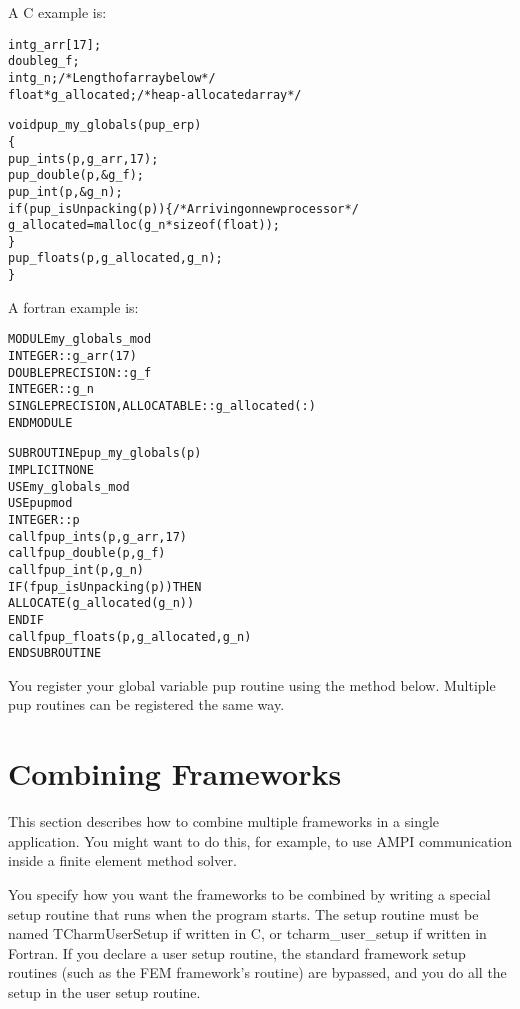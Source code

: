 \documentclass[10pt]{article}
\begin{document}
A C example is:
\begin{alltt}
     int g_arr[17];
     double g_f;
     int g_n; /*Length of array below*/
     float *g_allocated; /*heap-allocated array*/
 
     void pup_my_globals(pup_er p)
     \{
       pup_ints(p,g_arr,17);
       pup_double(p,&g_f);
       pup_int(p,&g_n);
       if (pup_isUnpacking(p)) \{ /*Arriving on new processor*/
         g_allocated=malloc(g_n*sizeof(float));
       \}
       pup_floats(p,g_allocated,g_n);
     \}
\end{alltt}

A fortran example is:
\begin{alltt}
     MODULE my_globals_mod
       INTEGER :: g_arr(17)
       DOUBLE PRECISION :: g_f
       INTEGER :: g_n
       SINGLE PRECISION, ALLOCATABLE :: g_allocated(:)
     END MODULE
 
     SUBROUTINE pup_my_globals(p)
       IMPLICIT NONE
       USE my_globals_mod
       USE pupmod
       INTEGER :: p
       call fpup_ints(p,g_arr,17)
       call fpup_double(p,g_f)
       call fpup_int(p,g_n)
       IF (fpup_isUnpacking(p)) THEN
         ALLOCATE(g_allocated(g_n))
       END IF
       call fpup_floats(p,g_allocated,g_n)
     END SUBROUTINE
\end{alltt}


You register your global variable pup routine using the method below.
Multiple pup routines can be registered the same way.

\vspace{0.2in}



\section{Combining Frameworks}
\label{sec:combining}

This section describes how to combine multiple frameworks in a 
single application.  You might want to do this, for example,
to use AMPI communication inside a finite element method solver.

You specify how you want the frameworks to be combined by writing
a special setup routine that runs when the program starts.
The setup routine must be named TCharmUserSetup if written in C, 
or tcharm\_user\_setup if written in Fortran.  If you declare a 
user setup routine, the standard framework setup routines (such
as the FEM framework's  routine) are bypassed, and you
do all the setup in the user setup routine.
\end{document}
